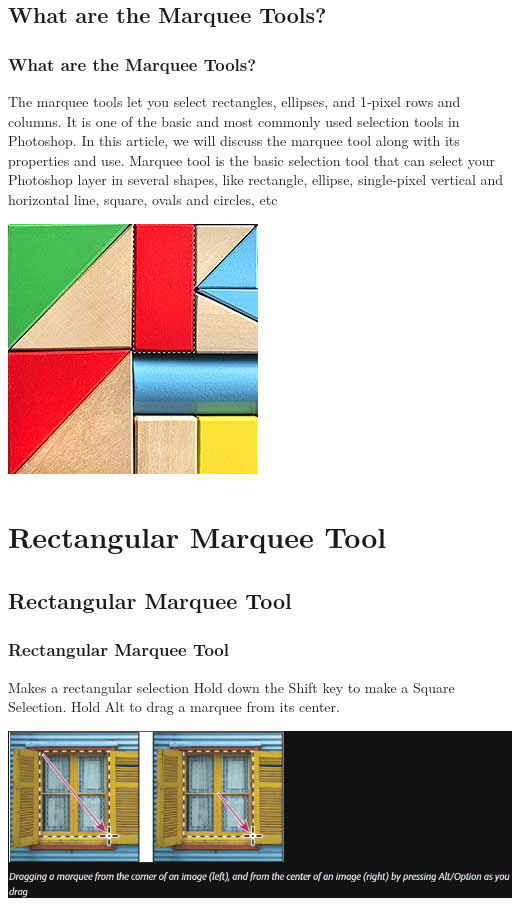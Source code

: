\documentclass{beamer}
\begin{document}
			\subsection{What are the Marquee Tools?}		
	\begin{frame}
		\frametitle{What are the Marquee Tools?}
	\begin{outline}
		\1 The marquee tools let you select rectangles, ellipses, and 1‑pixel rows and columns.
		\1 It is one of the basic and most commonly used selection tools in Photoshop. In this article, we will discuss the marquee tool along with its properties and use.
		\1 Marquee tool is the basic selection tool that can select your Photoshop layer in several shapes, like rectangle, ellipse, single-pixel vertical and horizontal line, square, ovals and circles, etc
	\end{outline}
\begin{center}
	\includegraphics[width=.5\textwidth]{images/photoshop-rectangular-marquee-tool-f.jpg}
	\end{center}
		\end{frame}


\section{Rectangular Marquee Tool}
\subsection{Rectangular Marquee Tool}	
\begin{frame}
	\frametitle{Rectangular Marquee Tool}
	\begin{outline}
		\1 Makes a rectangular selection 
		\1 Hold down the Shift key to make a Square Selection.
		\1 Hold Alt to drag a marquee from its center.

	\end{outline}
	\begin{center}
		\includegraphics[width = 1.0\textwidth]{images/drag marquee.png}
	\end{center}
\end{frame}
\end{document}
